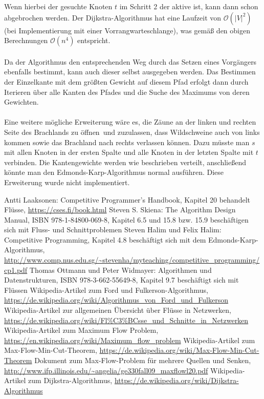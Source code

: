 \documentclass[a4paper, notitlepage, 12pt]{scrartcl}
\begin{document}
Wenn hierbei der gesuchte Knoten $t$ im Schritt 2 der aktive ist, kann dann schon abgebrochen werden.
Der Dijkstra-Algorithmus hat eine Laufzeit von $\mathcal{O}(|V|^{2})$ (bei Implementierung mit einer Vorrangwarteschlange), was gemäß den obigen Berechnungen $\mathcal{O}(n^{4})$ entspricht. \\ \\ Da der Algorithmus den entsprechenden Weg durch das Setzen eines Vorgängers ebenfalls bestimmt, kann auch dieser selbst ausgegeben werden. Das Bestimmen der Einzelkante mit dem größten Gewicht auf diesem Pfad erfolgt dann durch Iterieren über alle Kanten des Pfades und die Suche des Maximums von deren Gewichten. \\ \\
Eine weitere mögliche Erweiterung wäre es, die Zäune an der linken und rechten Seite des Brachlands zu \glqq öffnen\grqq ~und zuzulassen, dass Wildschweine auch von links kommen sowie das Brachland nach rechts verlassen können. Dazu müsste man $s$ mit allen Knoten in der ersten Spalte und alle Knoten in der letzten Spalte mit $t$ verbinden. Die Kantengewichte werden wie beschrieben verteilt, anschließend könnte man den Edmonds-Karp-Algorithmus normal ausführen. Diese Erweiterung wurde nicht implementiert.
\begin{thebibliography}{xx}
 Antti Laaksonen: Competitive Programmer’s Handbook, Kapitel 20 behandelt Flüsse, \url{https://cses.fi/book.html} 
 Steven S. Skiena: The Algorithm Design Manual, ISBN 978-1-84800-069-8, Kapitel 6.5 und 15.8 bzw. 15.9 beschäftigen sich mit Fluss- und Schnittproblemen
 Steven Halim und Felix Halim: Competitive Programming, Kapitel 4.8 beschäftigt sich mit dem Edmonds-Karp-Algorithmus, \url{http://www.comp.nus.edu.sg/~stevenha/myteaching/competitive_programming/cp1.pdf}
 Thomas Ottmann und Peter Widmayer: Algorithmen und Datenstrukturen, ISBN 978-3-662-55649-8, Kapitel 9.7 beschäftigt sich mit Flüssen
 Wikipedia-Artikel zum Ford und Fulkerson-Algorithmus, \url{https://de.wikipedia.org/wiki/Algorithmus_von_Ford_und_Fulkerson}
 Wikipedia-Artikel zur allgemeinen Übersicht über Flüsse in Netzwerken, \url{https://de.wikipedia.org/wiki/Fl\%C3\%BCsse_und_Schnitte_in_Netzwerken}
 Wikipedia-Artikel zum Maximum Flow Problem, \url{https://en.wikipedia.org/wiki/Maximum_flow_problem}
 Wikipedia-Artikel zum Max-Flow-Min-Cut-Theorem, \url{https://de.wikipedia.org/wiki/Max-Flow-Min-Cut-Theorem}
 Dokument zum Max-Flow-Problem für mehrere Quellen und Senken, \url{http://www.ifp.illinois.edu/~angelia/ge330fall09_maxflowl20.pdf}
 Wikipedia-Artikel zum Dijkstra-Algorithmus, \url{https://de.wikipedia.org/wiki/Dijkstra-Algorithmus}
\end{thebibliography}
\end{document}
